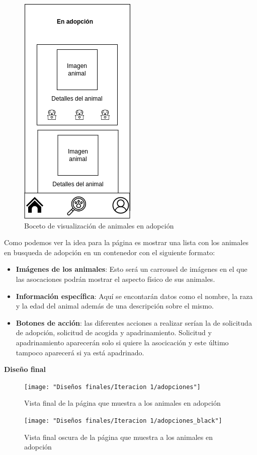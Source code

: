 \begin{figure}[H]
	\centering
	\includegraphics[width=0.31\linewidth]{"bocetos/iteracion 1/adopciones.drawio"}
	\caption{Boceto de visualización de animales en adopción}
	\label{fig:adopciones}
\end{figure}

Como podemos ver la idea para la página es mostrar una lista con los animales en busqueda de adopción en un contenedor con el siguiente formato:

\begin{itemize}
	\item \textbf{Imágenes de los animales}: Esto será un carrousel de imágenes en el que las asocaciones podrán mostrar el aspecto físico de sus animales.
	\item \textbf{Información específica}: Aquí se encontarán datos como el nombre, la raza y la edad del animal además de una descripción sobre el mismo.
	\item \textbf{Botones de acción}: las diferentes acciones a realizar serían la de solicituda de adopción, solicitud de acogida y apadrinamiento. Solicitud y apadrinamiento aparecerán solo si quiere la asocicación y este último tampoco aparecerá si ya está apadrinado.
\end{itemize}

\textbf{Diseño final} %

\begin{figure}[H]
	\begin{minipage}[t]{0.48\textwidth}
		\centering
		\texttt{[image: "Diseños finales/Iteracion 1/adopciones"]}
		\caption{Vista final de la página que muestra a los animales en adopción}
		\label{fig:adopcionesDef}
	\end{minipage} \hfill
	
	\begin{minipage}[t]{0.48\textwidth}
		\centering
		\texttt{[image: "Diseños finales/Iteracion 1/adopciones\_black"]}
		\caption{Vista final oscura de la página que muestra a los animales en adopción}
		\label{fig:adopcionesDefBlack}
	\end{minipage}
\end{figure}







